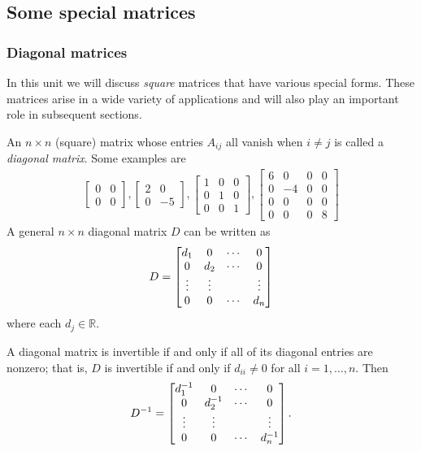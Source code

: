 \documentclass[12pt,letterpaper,reqno]{article}
\numberwithin{equation}{section}
\newcommand{\ti}[1]{\textit{#1}}
\begin{document}
\subsection{Some special matrices}
\subsubsection{Diagonal matrices}
In this unit we will discuss \ti{square} matrices that have various special forms. These matrices arise in a wide variety of applications and will also play an important role in subsequent sections.

An $n \times n$ (square) matrix whose entries $A_{ij}$ all vanish when $i \neq j$ is called a \ti{diagonal matrix}. Some examples are
\begin{align*}
	\begin{bmatrix}
		0 & 0\\ 0 & 0
	\end{bmatrix}, \begin{bmatrix}
		2 & 0 \\ 0 & -5
	\end{bmatrix}, \begin{bmatrix}
		1 & 0 & 0 \\ 0 & 1 & 0 \\ 0 & 0 & 1
	\end{bmatrix}, \begin{bmatrix}
		6 & 0 & 0 & 0 \\ 0 & -4 & 0 & 0 \\ 0 & 0 & 0 & 0 \\ 0 & 0 & 0 & 8
	\end{bmatrix}
\end{align*}
A general $n \times n$ diagonal matrix $D$ can be written as 
\begin{equation}\label{eq:diagonal_matrix}
	D=\begin{bmatrix}
		d_1 & 0 & \cdots & 0 \\
		0 & d_2 & \cdots & 0 \\
		\vdots & \vdots & \hspace{0.25cm} & \vdots \\
		0 & 0 & \cdots & d_n
	\end{bmatrix}
\end{equation}
where each $d_j \in \mathbb{R}$.

A diagonal matrix is invertible if and only if all of its diagonal entries are nonzero; that is, $D$ is invertible if and only if $d_{ii} \neq 0$ for all $i=1,\dots,n$. Then
\begin{equation}\label{eq:inverse_diagonal_matrix}
	D^{-1}=\begin{bmatrix}
		d_1^{-1} & 0 & \cdots & 0 \\
		0 & d_2^{-1} & \cdots & 0 \\
		\vdots & \vdots & \hspace{0.25cm} & \vdots \\
		0 & 0 & \cdots & d_n^{-1}
	\end{bmatrix}.
\end{equation}
\end{document}

